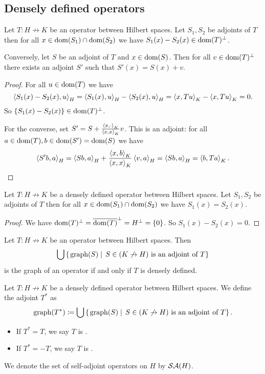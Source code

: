 \subsection{Densely defined operators}
\begin{lemma}
Let $T: H\not\to K$ be an operator between Hilbert spaces. Let $S_1, S_2$ be adjoints of $T$ then for all $x\in \operatorname{dom}(S_1)\cap\operatorname{dom}(S_2)$ we have $S_1(x) - S_2(x) \in \operatorname{dom}(T)^\perp$.

Conversely, let $S$ be an adjoint of $T$ and $x\in\operatorname{dom}(S)$. Then for all $v\in \operatorname{dom}(T)^\perp$ there exists an adjoint $S'$ such that $S'(x) = S(x) + v$.
\end{lemma}
\begin{proof}
For all $u\in \operatorname{dom}(T)$ we have
\[ \left\langle S_1(x) - S_2(x), u \right\rangle_H = \left\langle S_1(x), u \right\rangle_H - \left\langle S_2(x), u \right\rangle_H = \left\langle x, Tu \right\rangle_K - \left\langle x, Tu \right\rangle_K = 0. \]
So $\{S_1(x) - S_2(x)\} \in \operatorname{dom}(T)^\perp$.

For the converse, set $S' = S + \frac{\left\langle x,\cdot \right\rangle_K}{\left\langle x,x \right\rangle_K}v$. This is an adjoint: for all $a\in \operatorname{dom}(T), b\in \operatorname{dom}(S') = \operatorname{dom}(S)$ we have
\[  \left\langle S' b,a \right\rangle_H = \left\langle Sb, a \right\rangle_H + \frac{\left\langle x,b \right\rangle_K}{\left\langle x,x \right\rangle_K}\left\langle v,a \right\rangle_H = \left\langle Sb, a \right\rangle_H = \left\langle b,Ta \right\rangle_K. \]
\end{proof}
\begin{corollary}
Let $T: H\not\to K$ be a densely defined operator between Hilbert spaces. Let $S_1, S_2$ be adjoints of $T$ then for all $x\in \operatorname{dom}(S_1)\cap\operatorname{dom}(S_2)$ we have $S_1(x) = S_2(x)$.
\end{corollary}
\begin{proof}
We have $\operatorname{dom}(T)^\perp = \overline{\operatorname{dom}(T)}^\perp = H^\perp = \{0\}$. So $S_1(x) - S_2(x) = 0$.
\end{proof}
\begin{corollary} \label{corollary:maximalAdjointIsOperator}
Let $T: H\not\to K$ be an operator between Hilbert spaces. Then
\[ \bigcup\left\{\left. \operatorname{graph}(S) \;\right|\; \text{$S\in (K\not\to H)$ is an adjoint of $T$} \right\} \]
is the graph of an operator \textup{if and only if} $T$ is densely defined.
\end{corollary}

\begin{definition}
Let $T: H\not\to K$ be a densely defined operator between Hilbert spaces. We define the adjoint $T^*$ as
\[ \operatorname{graph}(T^*) \coloneqq \bigcup\left\{\left. \operatorname{graph}(S) \;\right|\; \text{$S\in (K\not\to H)$ is an adjoint of $T$} \right\}. \]
\begin{itemize}
\item If $T^* = T$, we say $T$ is .
\item If $T^* = -T$, we say $T$ is .
\end{itemize}
We denote the set of self-adjoint operators on $H$ by $\mathop{\mathcal{SA}}\nolimits(H)$.
\end{definition}

